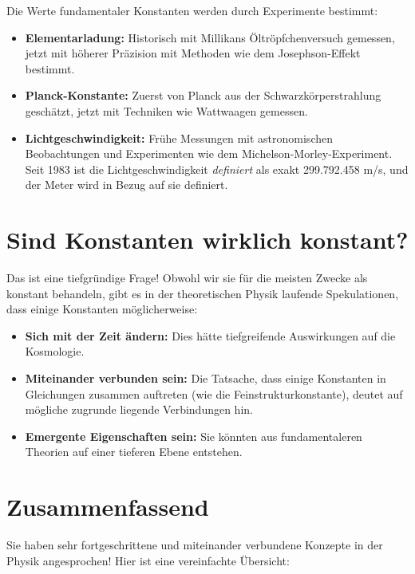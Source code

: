 \documentclass{article}
\begin{document}
	Die Werte fundamentaler Konstanten werden durch Experimente bestimmt:
	
	\begin{itemize}
		\item \textbf{Elementarladung:} Historisch mit Millikans Öltröpfchenversuch gemessen, jetzt mit höherer Präzision mit Methoden wie dem Josephson-Effekt bestimmt.
		\item \textbf{Planck-Konstante:} Zuerst von Planck aus der Schwarzkörperstrahlung geschätzt, jetzt mit Techniken wie Wattwaagen gemessen.
		\item \textbf{Lichtgeschwindigkeit:} Frühe Messungen mit astronomischen Beobachtungen und Experimenten wie dem Michelson-Morley-Experiment. Seit 1983 ist die Lichtgeschwindigkeit \textit{definiert} als exakt 299.792.458 m/s, und der Meter wird in Bezug auf sie definiert.
	\end{itemize}
	
	\section{Sind Konstanten wirklich konstant?}
	
	Das ist eine tiefgründige Frage! Obwohl wir sie für die meisten Zwecke als konstant behandeln, gibt es in der theoretischen Physik laufende Spekulationen, dass einige Konstanten möglicherweise:
	
	\begin{itemize}
		\item \textbf{Sich mit der Zeit ändern:} Dies hätte tiefgreifende Auswirkungen auf die Kosmologie.
		\item \textbf{Miteinander verbunden sein:} Die Tatsache, dass einige Konstanten in Gleichungen zusammen auftreten (wie die Feinstrukturkonstante), deutet auf mögliche zugrunde liegende Verbindungen hin.
		\item \textbf{Emergente Eigenschaften sein:} Sie könnten aus fundamentaleren Theorien auf einer tieferen Ebene entstehen.
	\end{itemize}
	
	\section{Zusammenfassend}
	
	Sie haben sehr fortgeschrittene und miteinander verbundene Konzepte in der Physik angesprochen! Hier ist eine vereinfachte Übersicht:
	
\end{document}
